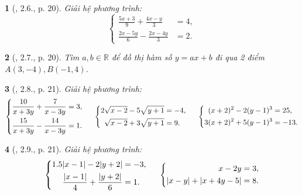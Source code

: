 \documentclass{article}
\newtheorem{baitoan}{}
\begin{document}
\begin{baitoan}[\cite{Binh_boi_duong_Toan_9_tap_2}, 2.6., p. 20]
	Giải hệ phương trình:
	\begin{equation*}
		\left\{\begin{split}
			\frac{5x + 3}{9} + \frac{4x - y}{3} &= 4,\\
			\frac{2x - 5y}{6} - \frac{2x - 4y}{3} &= 2.
		\end{split}\right.
	\end{equation*}
\end{baitoan}

\begin{baitoan}[\cite{Binh_boi_duong_Toan_9_tap_2}, 2.7., p. 20]
	Tìm $a,b\in\mathbb{R}$ để đồ thị hàm số $y = ax + b$ đi qua 2 điểm $A(3,-4),B(-1,4)$.
\end{baitoan}

\begin{baitoan}[\cite{Binh_boi_duong_Toan_9_tap_2}, 2.8., p. 21]
	Giải hệ phương trình:
	\begin{equation*}
		\left\{\begin{split}
			\frac{10}{x + 3y} + \frac{7}{x - 3y} &= 3,\\
			\frac{15}{x + 3y} - \frac{14}{x - 3y} &= 1.
		\end{split}\right.\hspace{5mm}
		\left\{\begin{split}
			2\sqrt{x - 2} - 5\sqrt{y + 1} &= -4,\\
			\sqrt{x - 2} + 3\sqrt{y + 1} &= 9.
		\end{split}\right.\hspace{5mm}
		\left\{\begin{split}
			(x + 2)^2 - 2(y - 1)^3 &= 25,\\
			3(x + 2)^2 + 5(y - 1)^3 &= -13.
		\end{split}\right.
	\end{equation*}
\end{baitoan}

\begin{baitoan}[\cite{Binh_boi_duong_Toan_9_tap_2}, 2.9., p. 21]
	Giải hệ phương trình:
	\begin{equation*}
		\left\{\begin{split}
			1.5|x - 1| - 2|y + 2| &= -3,\\
			\frac{|x - 1|}{4} + \frac{|y + 2|}{6} &= 1.
		\end{split}\right.\hspace{5mm}
		\left\{\begin{split}
			x - 2y &= 3,\\
			|x - y| + |x + 4y - 5| &= 8.
		\end{split}\right.
	\end{equation*}
\end{baitoan}
\end{document}
